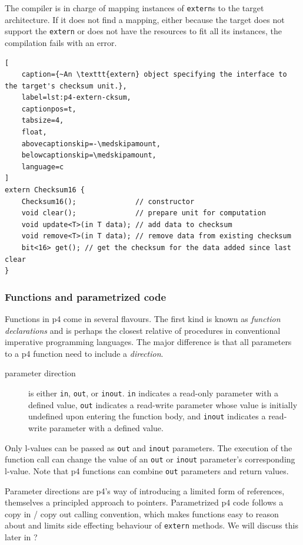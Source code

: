 The compiler is in charge of mapping instances of \texttt{extern}s to the target
architecture. If it does not find a mapping, either because the target does not
support the \texttt{extern} or does not have the resources to fit all its
instances, the compilation fails with an error.

\begin{lstlisting}[
	caption={~An \texttt{extern} object specifying the interface to the target's checksum unit.},
	label=lst:p4-extern-cksum,
	captionpos=t,
	tabsize=4,
	float,
	abovecaptionskip=-\medskipamount,
	belowcaptionskip=\medskipamount,
	language=c
]
extern Checksum16 {
	Checksum16();              // constructor
	void clear();              // prepare unit for computation
	void update<T>(in T data); // add data to checksum
	void remove<T>(in T data); // remove data from existing checksum
	bit<16> get(); // get the checksum for the data added since last clear
}
\end{lstlisting}

\subsubsection*{Functions and parametrized code}

Functions in \acrshort{p4} come in several flavours. The first kind is known as
\emph{function declarations} and is perhaps the closest relative of procedures
in conventional imperative programming languages. The major difference is that
all parameters to a \acrshort{p4} function need to include a \emph{direction}.

\begin{description}
	\item[parameter direction] is either \texttt{in}, \texttt{out}, or
	\texttt{inout}. \texttt{in} indicates a read-only parameter with a defined
	value, \texttt{out} indicates a read-write parameter whose value is
	initially undefined upon entering the function body, and \texttt{inout}
	indicates a read-write parameter with a defined value.
\end{description}

Only l-values can be passed as \texttt{out} and
\texttt{inout} parameters. The execution of the function call can change the
value of an \texttt{out} or \texttt{inout} parameter's corresponding l-value.
Note that \acrshort{p4} functions can combine \texttt{out} parameters and return
values.

Parameter directions are \acrshort{p4}'s way of introducing a limited form of
references, themselves a principled approach to pointers. Parametrized
\acrshort{p4} code follows a copy in / copy out calling convention, which makes
functions easy to reason about and limits side effecting behaviour of
\texttt{extern} methods. We will discuss this later in ?

